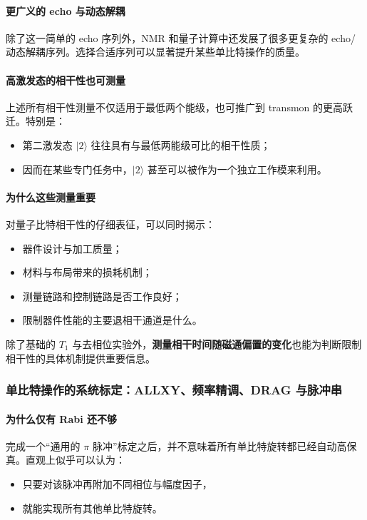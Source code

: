 \documentclass[12pt,a4paper,oneside]{ctexbook}
\begin{document}
\paragraph{更广义的 echo 与动态解耦}
除了这一简单的 echo 序列外，NMR 和量子计算中还发展了很多更复杂的 echo/动态解耦序列。选择合适序列可以显著提升某些单比特操作的质量。

\paragraph{高激发态的相干性也可测量}
上述所有相干性测量不仅适用于最低两个能级，也可推广到 transmon 的更高跃迁。特别是：
\begin{itemize}
    \item 第二激发态 \(|2\rangle\) 往往具有与最低两能级可比的相干性质；
    \item 因而在某些专门任务中，\(|2\rangle\) 甚至可以被作为一个独立工作模来利用。
\end{itemize}

\paragraph{为什么这些测量重要}
对量子比特相干性的仔细表征，可以同时揭示：
\begin{itemize}
    \item 器件设计与加工质量；
    \item 材料与布局带来的损耗机制；
    \item 测量链路和控制链路是否工作良好；
    \item 限制器件性能的主要退相干通道是什么。
\end{itemize}

除了基础的 \(T_1\) 与去相位实验外，\textbf{测量相干时间随磁通偏置的变化}也能为判断限制相干性的具体机制提供重要信息。

\subsubsection{单比特操作的系统标定：ALLXY、频率精调、DRAG 与脉冲串}

\paragraph{为什么仅有 Rabi 还不够}
完成一个“通用的 \(\pi\) 脉冲”标定之后，并不意味着所有单比特旋转都已经自动高保真。直观上似乎可以认为：
\begin{itemize}
    \item 只要对该脉冲再附加不同相位与幅度因子，
    \item 就能实现所有其他单比特旋转。
\end{itemize}
\end{document}
